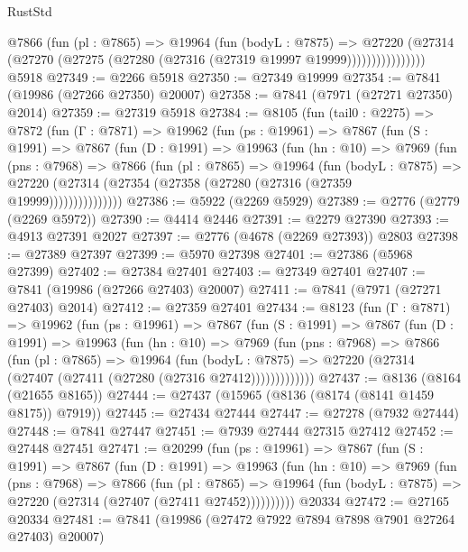 \begin{lexlean}{RustStd}
\begin{coremodule}
                  @7866
                    (fun (pl : @7865) =>
                    @19964
                      (fun (bodyL : @7875) =>
                      @27220
                        (@27314
                          (@27270 (@27275 (@27280 (@27316 (@27319 @19997 @19999))))))))))))))))
    @5918
@27349 := @2266 @5918
@27350 := @27349 @19999
@27354 := @7841 (@19986 (@27266 @27350) @20007)
@27358 := @7841 (@7971 (@27271 @27350) @2014)
@27359 := @27319 @5918
@27384 := @8105
    (fun (tail0 : @2275) =>
    @7872
      (fun (Γ : @7871) =>
      @19962
        (fun (ps : @19961) =>
        @7867
          (fun (S : @1991) =>
          @7867
            (fun (D : @1991) =>
            @19963
              (fun (hn : @10) =>
              @7969
                (fun (pns : @7968) =>
                @7866
                  (fun (pl : @7865) =>
                  @19964
                    (fun (bodyL : @7875) =>
                    @27220 (@27314 (@27354 (@27358 (@27280 (@27316 (@27359 @19999)))))))))))))))
@27386 := @5922 (@2269 @5929)
@27389 := @2776 (@2779 (@2269 @5972))
@27390 := @4414 @2446
@27391 := @2279 @27390
@27393 := @4913 @27391 @2027
@27397 := @2776 (@4678 (@2269 @27393)) @2803
@27398 := @27389 @27397
@27399 := @5970 @27398
@27401 := @27386 (@5968 @27399)
@27402 := @27384 @27401
@27403 := @27349 @27401
@27407 := @7841 (@19986 (@27266 @27403) @20007)
@27411 := @7841 (@7971 (@27271 @27403) @2014)
@27412 := @27359 @27401
@27434 := @8123
    (fun (Γ : @7871) =>
    @19962
      (fun (ps : @19961) =>
      @7867
        (fun (S : @1991) =>
        @7867
          (fun (D : @1991) =>
          @19963
            (fun (hn : @10) =>
            @7969
              (fun (pns : @7968) =>
              @7866
                (fun (pl : @7865) =>
                @19964
                  (fun (bodyL : @7875) =>
                  @27220 (@27314 (@27407 (@27411 (@27280 (@27316 @27412)))))))))))))
@27437 := @8136 (@8164 (@21655 @8165))
@27444 := @27437 (@15965 (@8136 (@8174 (@8141 @1459 @8175)) @7919))
@27445 := @27434 @27444
@27447 := @27278 (@7932 @27444)
@27448 := @7841 @27447
@27451 := @7939 @27444 @27315 @27412
@27452 := @27448 @27451
@27471 := @20299
    (fun (ps : @19961) =>
    @7867
      (fun (S : @1991) =>
      @7867
        (fun (D : @1991) =>
        @19963
          (fun (hn : @10) =>
          @7969
            (fun (pns : @7968) =>
            @7866
              (fun (pl : @7865) =>
              @19964 (fun (bodyL : @7875) => @27220 (@27314 (@27407 (@27411 @27452))))))))))
    @20334
@27472 := @27165 @20334
@27481 := @7841 (@19986 (@27472 @7922 @7894 @7898 @7901 @27264 @27403) @20007)

\end{coremodule}
\end{lexlean}
